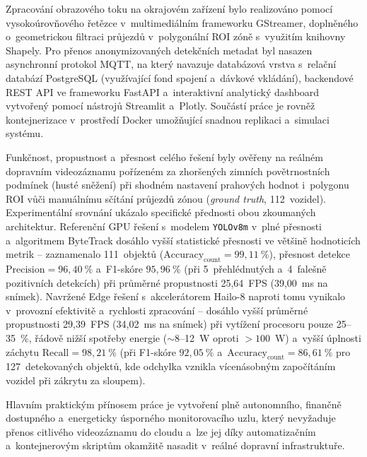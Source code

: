 Zpracování obrazového toku na okrajovém zařízení bylo realizováno pomocí vysokoúrovňového řetězce v~multimediálním frameworku GStreamer, doplněného o~geometrickou filtraci průjezdů v~polygonální ROI zóně s~využitím knihovny Shapely. Pro přenos anonymizovaných detekčních metadat byl nasazen asynchronní protokol \acs{MQTT}, na který navazuje databázová vrstva s~relační databází PostgreSQL (využívající fond spojení a~dávkové vkládání), backendové \acs{REST} \acs{API} ve frameworku FastAPI a~interaktivní analytický dashboard vytvořený pomocí nástrojů Streamlit a~Plotly. Součástí práce je rovněž kontejnerizace v~prostředí Docker umožňující snadnou replikaci a~simulaci systému.

Funkčnost, propustnost a~přesnost celého řešení byly ověřeny na reálném dopravním videozáznamu pořízeném za zhoršených zimních povětrnostních podmínek (husté sněžení) při shodném nastavení prahových hodnot i~polygonu ROI vůči manuálnímu sčítání průjezdů zónou (\textit{ground truth}, 112~vozidel). Experimentální srovnání ukázalo specifické přednosti obou zkoumaných architektur. Referenční GPU řešení s~modelem \texttt{YOLOv8m} v~plné přesnosti a~algoritmem ByteTrack dosáhlo vyšší statistické přesnosti ve většině hodnoticích metrik – zaznamenalo 111~objektů ($\text{Accuracy}_{\text{count}} = 99{,}11~\%$), přesnost detekce $\text{Precision} = 96{,}40~\%$ a~F1-skóre $95{,}96~\%$ (při 5~přehlédnutých a~4~falešně pozitivních detekcích) při průměrné propustnosti 25,64~\acs{FPS} (39,00~ms na snímek). Navržené Edge řešení s~akcelerátorem Hailo-8 naproti tomu vynikalo v~provozní efektivitě a~rychlosti zpracování – dosáhlo vyšší průměrné propustnosti 29,39~FPS (34,02~ms na snímek) při vytížení procesoru pouze 25--35~\%, řádově nižší spotřeby energie ($\sim$8--12~W oproti $> 100$~W) a~vyšší úplnosti záchytu $\text{Recall} = 98{,}21~\%$ (při F1-skóre $92{,}05~\%$ a~$\text{Accuracy}_{\text{count}} = 86{,}61~\%$ pro 127~detekovaných objektů, kde odchylka vznikla vícenásobným započítáním vozidel při zákrytu za sloupem).

Hlavním praktickým přínosem práce je vytvoření plně autonomního, finančně dostupného a~energeticky úsporného monitorovacího uzlu, který nevyžaduje přenos citlivého videozáznamu do cloudu a~lze jej díky automatizačním a~kontejnerovým skriptům okamžitě nasadit v~reálné dopravní infrastruktuře.


